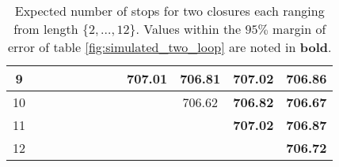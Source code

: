 \begin{table}[H]
\begin{adjustbox}{max width=\textwidth,max height=2\textheight}
\begin{tabular}{|c|c|c|c|c|c|c|c|c|c|c|c|}
  \hline
  9 &               &               &               &               &               &               &               & \textbf{707.01} & \textbf{706.81} & \textbf{707.02} & \textbf{706.86} \\
  \hline
  10 &              &               &               &               &               &               &               &               & 706.62 & \textbf{706.82} & \textbf{706.67} \\
  \hline
  11 &              &               &               &               &               &               &               &               &               & \textbf{707.02} & \textbf{706.87} \\
  \hline
  12 &              &               &               &               &               &               &               &               &               &               & \textbf{706.72} \\
  \hline
\end{tabular}

  \end{adjustbox}
  \caption{Expected number of stops for two closures each ranging
    from length $\{2,\dots,12\}$. Values within the $95\%$ margin of
    error of table \protect\ref{fig:simulated_two_loop} are noted in
  \textbf{bold}.}
\end{table}

